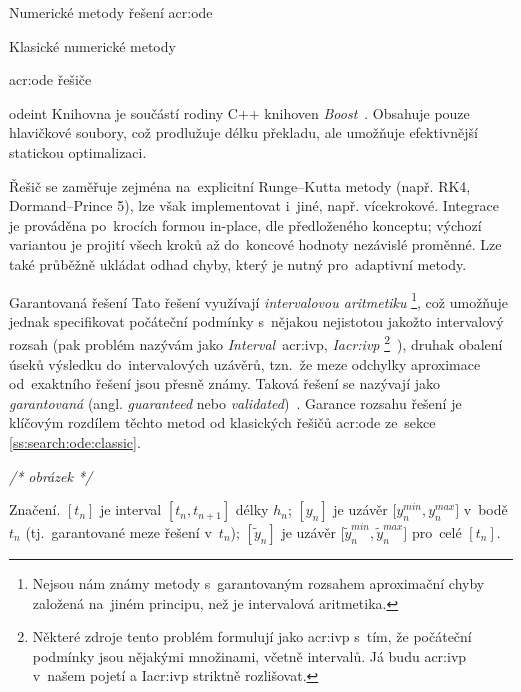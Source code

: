 \documentclass[thesis=M,czech]{FITthesis}[2012/06/26]
\newcommand{\acrlabel}[1]{acr:#1}
\newcommand{\acr}[1]{\acrshort{\acrlabel{#1}}}
\newcommand{\cmt}[1]{\textit{/* #1 */}}
\newcommand{\hl}[1]{\textit{#1}}
\newcommand{\name}[1]{\hl{#1}}
\newcommand{\cit}[1]{\cite{#1}}
\newcommand{\rf}[1]{\ref{#1}}
\newcommand{\pred}[1]{\ensuremath{\tilde{#1}}}
\begin{document}
\begin{section}{Numerické metody řešení \acr{ode}}
\begin{subsection}{Klasické numerické metody}
\begin{subsubsection}{\acr{ode} řešiče}
\begin{paragraph}{odeint}
Knihovna je součástí rodiny C++ knihoven \name{Boost}~\cit{boost-libs}.
Obsahuje pouze hlavičkové soubory,
což prodlužuje délku překladu,
ale umožňuje efektivnější statickou optimalizaci.

Řešič se zaměřuje zejména na~explicitní Runge--Kutta metody
(např. RK4, Dormand--Prince 5),
lze však implementovat i~jiné, např. vícekrokové.
Integrace je prováděna po~krocích formou in-place,
dle předloženého konceptu;
výchozí variantou je projití všech kroků
až do~koncové hodnoty nezávislé proměnné.
Lze také průběžně ukládat odhad chyby,
který je nutný pro~adaptivní metody.
\end{paragraph} %


\end{subsubsection} %


\end{subsection} %


\begin{subsection}{Garantovaná řešení}\label{ss:search:ode:valid}
Tato řešení využívají \name{intervalovou aritmetiku}%
\footnote{Nejsou nám známy metody s~garantovaným rozsahem aproximační chyby
založená na~jiném principu, než je intervalová aritmetika.},
což umožňuje jednak specifikovat počáteční podmínky
s~nějakou nejistotou jakožto intervalový rozsah
(pak problém nazývám jako \name{Interval}~\acr{ivp},
\name{I\acr{ivp}}%
\footnote{Některé zdroje tento problém formulují
jako \acr{ivp} s~tím, že počáteční podmínky
jsou nějakými množinami, včetně intervalů.
Já budu \acr{ivp} v~našem pojetí a I\acr{ivp}
striktně rozlišovat.}~\cit{ode-valid-runge_kutta-art}),
druhak obalení úseků výsledku do~intervalových uzávěrů,
tzn.~že meze odchylky aproximace od~exaktního řešení
jsou přesně známy.
Taková řešení se nazývají jako \name{garantovaná}
(angl. \name{guaranteed}
nebo \name{validated})~\cit{ode-valid-runge_kutta-art}.
Garance rozsahu řešení je klíčovým rozdílem
těchto metod
od klasických řešičů \acr{ode}
ze~sekce \rf{ss:search:ode:classic}.

\cmt{obrázek}


\begin{paragraph}{Značení.}\label{p:search:ode:valid:sign}
${[t_n]}$ je interval ${[t_{n}, t_{n+1}]}$ délky $h_n$;
${[y_n]}$ je uzávěr ${[y^{min}_{n}, y^{max}_{n}}]$ v~bodě $t_n$
(tj.~garantované meze řešení v~$t_n$);
${[\pred{y}_n]}$ je uzávěr ${[\pred{y}^{min}_{n}, \pred{y}^{max}_{n}}]$
pro~celé ${[t_n]}$.
\end{paragraph} %


\end{subsection}
\end{section}
\end{document}
